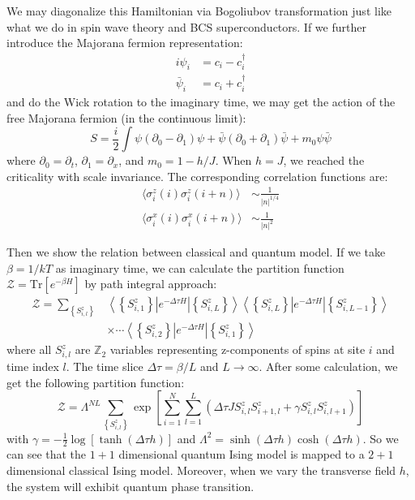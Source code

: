 \documentclass{article}
\theoremstyle{plain} \newtheorem{thm}{Theorem}[section]
\theoremstyle{definition} \newtheorem{df}{Definition}[section]
\theoremstyle{definition} \newtheorem{eg}{Example}
\theoremstyle{remark} \newtheorem*{rmk}{Remark}
\begin{document}
	We may diagonalize this Hamiltonian via Bogoliubov transformation just like what we do in spin wave theory and BCS superconductors. If we further introduce the Majorana fermion representation:
	\begin{align}
	i\psi_i&=c_i-c_i^{\dagger}\\
	\bar{\psi}_i&=c_i+c_i^{\dagger}
	\end{align}
	and do the Wick rotation to the imaginary time, we may get the action of the free Majorana fermion (in the continuous limit):
	\begin{equation}
		S=\frac{i}{2}\int\psi(\partial_0-\partial_1)\psi+\bar{\psi}(\partial_0+\partial_1)\bar{\psi}+m_0\psi\bar{\psi}
	\end{equation}
	where $\partial_0=\partial_t$, $\partial_1=\partial_x$, and $m_0=1-h/J$. When $h=J$, we reached the criticality with scale invariance. The corresponding correlation functions are:
    \begin{align}
	  \langle \sigma_i^z(i)\sigma_i^z(i+n)\rangle&\sim\frac{1}{|n|^{1/4}}\\	
	  \langle \sigma_i^x(i)\sigma_i^x(i+n)\rangle&\sim\frac{1}{|n|^2}
    \end{align}
	
	Then we show the relation between classical and quantum model. If we take $\beta=1/kT$ as imaginary time, we can calculate the partition function $\mathcal{Z}=\mathrm{Tr}[e^{-\beta H}]$ by path integral approach:
	\begin{equation}
	\begin{aligned}
	\mathcal{Z}=\sum_{\left\lbrace S^z_{i,l}\right\rbrace }&\left\langle \left\lbrace S_{i,1}^z\right\rbrace\right|e^{-\Delta\tau H}\left|\left\lbrace S_{i,L}^z\right\rbrace\right\rangle\left\langle \left\lbrace S_{i,L}^z\right\rbrace\left|e^{-\Delta\tau H}\right|\left\lbrace S_{i,L-1}^z\right\rbrace\right\rangle \\
	&\times\cdots\left\langle \left\lbrace S_{i,2}^z\right\rbrace\left|e^{-\Delta\tau H}\right|\left\lbrace S_{i,1}^z\right\rbrace\right\rangle
	\end{aligned}
	\end{equation}
	where all $S^z_{i,l}$ are $\mathbb{Z}_2$ variables representing z-components of spins at site $i$ and time index $l$. The time slice $\Delta\tau=\beta/L$ and $L \to \infty$. After some calculation, we get the following partition function:
	\begin{equation}
	\mathcal{Z}=\Lambda^{NL}\sum_{\left\lbrace S^z_{i,l}\right\rbrace }\exp\left[\sum_{i=1}^N\sum_{l=1}^L\left(\Delta\tau JS^z_{i,l}S^z_{i+1,l}+\gamma S^z_{i,l}S^z_{i,l+1}\right)\right]
	\end{equation}
	with $\gamma=-\frac{1}{2}\log[ \tanh(\Delta\tau h) ]$ and $\Lambda^2=\sinh(\Delta\tau h)\cosh(\Delta\tau h)$. So we can see that the $1+1$ dimensional quantum Ising model is mapped to a $2+1$ dimensional classical Ising model. Moreover, when we vary the transverse field $h$, the system will exhibit quantum phase transition.
	
\end{document}
